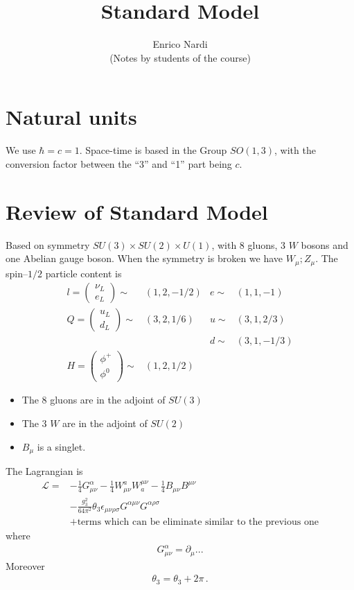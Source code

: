 \documentclass[12pt,letterpaper]{article}
\title{Standard Model}
\author{Enrico Nardi\\
(Notes by students of the course)}
\begin{document}
\maketitle

\section{Natural units}
We use $\hbar=c=1$.  
Space-time is based in the Group $SO(1,3)$, with the conversion factor between the ``3'' and ``1'' part being $c$. 

\section{Review of Standard Model}
Based on symmetry $SU(3)\times SU(2)\times U(1)$, with 8 gluons, 3 $W$  bosons and one Abelian gauge boson. When the symmetry is broken we have $W_{\mu}; Z_{\mu}$. The spin--$1/2$ particle content is
\begin{align}
  l=
  \begin{pmatrix}
    \nu_L\\ e_{L}
  \end{pmatrix}\sim& (1,2,-1/2)  & e\sim&(1,1,-1)\\
  Q=
  \begin{pmatrix}
    u_L\\ d_L
  \end{pmatrix}\sim& (3,2,1/6)  & u\sim&(3,1,2/3)\\
&&d\sim&(3,1,-1/3)\\
  H=
  \begin{pmatrix}
    \phi^+\\ \phi^0
  \end{pmatrix}\sim& (1,2,1/2)  & &
\end{align}
\begin{itemize}
\item The 8 gluons are in the adjoint of $SU(3)$
\item The 3 $W$ are in the adjoint of $SU(2)$
\item $B_{\mu}$ is a singlet.
\end{itemize}
The Lagrangian is
\begin{align*}
  \mathcal{L}=&-\frac{1}{4}G_{\mu\nu}^{\alpha}-\frac{1}{4}W^{a}_{\mu\nu}W_{a}^{\mu\nu}
-\frac{1}{4}B_{\mu\nu}B^{\mu\nu}\\
&-\frac{g_3^2}{64\pi^2}\theta_3\epsilon_{\mu\nu\rho\sigma}G^{\alpha\mu\nu}G^{\alpha\rho\sigma}\\
&+\text{terms which can be eliminate similar to the previous one}
\end{align*}
where
\begin{align*}
  G_{\mu\nu}^{\alpha}=\partial_{\mu}...
\end{align*}
Moreover
\begin{align*}
  \theta_3=\theta_3+2\pi\,.
\end{align*}
\end{document}
